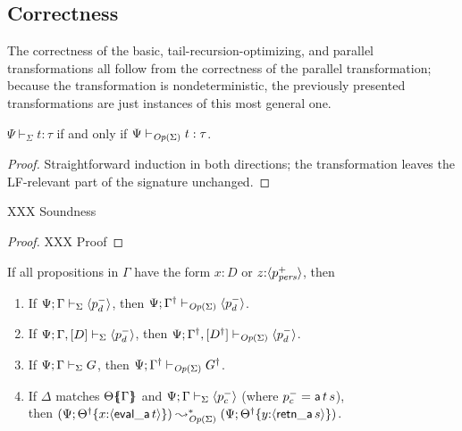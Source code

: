 \subsection{Correctness}
\label{sec:operationalization-correct}

The correctness of the basic, tail-recursion-optimizing, and parallel
transformations all follow from the correctness of the parallel
transformation; because the transformation is nondeterministic, the
previously presented transformations are just instances of this most
general one.

\bigskip
\begin{theorem}
  $\Psi \vdash_\Sigma t : \tau$ if and only if $\Psi
  \vdash_{{\it Op}({\Sigma})} t : \tau$.
\end{theorem}

\begin{proof}
Straightforward induction in both directions; the transformation 
leaves the LF-relevant part of the signature unchanged.
\end{proof}

\begin{theorem}
XXX Soundness
\end{theorem}

\begin{proof}
XXX Proof
\end{proof}

\begin{theorem}
If all propositions in $\Gamma$ have the form 
$x{:}D$ or $z{:}\langle {p^+_{{\it pers}}} \rangle$, then
\begin{enumerate}
\item  
If ${\Psi}; {\Gamma} \vdash_{\Sigma} {\langle {p^-_d} \rangle}$,
then ${\Psi}; {{{\Gamma}^\dag}} \vdash_{{\it Op}({\Sigma})} {\langle {p^-_d} \rangle}$.
\item  
If ${\Psi}; {\Gamma, [D]} \vdash_{\Sigma} {\langle {p^-_d} \rangle}$,
then ${\Psi}; {{{\Gamma}^\dag}, [{{D}^\dag}]} \vdash_{{\it Op}({\Sigma})} {\langle {p^-_d} \rangle}$.
\item  
If ${\Psi}; {\Gamma} \vdash_{\Sigma} {G}$,
then ${\Psi}; {{{\Gamma}^\dag}} \vdash_{{\it Op}({\Sigma})} {{{G}^\dag}}$.
\item
If $\Delta$ matches ${\Theta}\mbox{$\{\hspace{-4pt}\{$}{\Gamma}\mbox{$\}\hspace{-4pt}\}$}$ 
and ${\Psi}; {\Gamma} \vdash_{\Sigma} {\langle {p^-_c} \rangle}$
(where $p^-_c = {\sf a}\,t\,s$),\\
then
$(\Psi; {{{\Theta}^\dag}}\{{x{:}\langle {{\sf eval\_a}\,t} \rangle}\}) 
  \leadsto^*_{{\it Op}({\Sigma})}
 (\Psi; {{{\Theta}^\dag}}\{{y{:}\langle {{\sf retn\_a}\,s} \rangle}\})$.
\end{enumerate}
\end{theorem}

